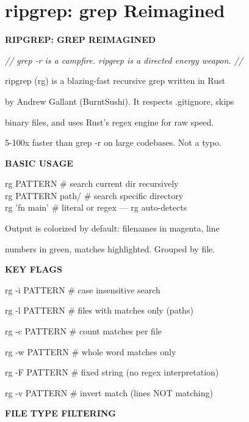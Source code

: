 \documentclass[11pt,a4paper,twoside]{book}
\begin{document}
\section{ripgrep: grep Reimagined}


\vspace{10pt}
{\large\bfseries\color{neoncyan} RIPGREP: GREP REIMAGINED}\vspace{6pt}

{\small\itshape\color{dimtext} // grep -r is a campfire. ripgrep is a directed energy weapon. //}

ripgrep (rg) is a blazing-fast recursive grep written in Rust

by Andrew Gallant (BurntSushi). It respects .gitignore, skips

binary files, and uses Rust's regex engine for raw speed.

5-100x faster than grep -r on large codebases. Not a typo.


\vspace{12pt}
{\bfseries\color{neonyellow} BASIC USAGE}\vspace{4pt}

\begin{codebox}
rg PATTERN           \# search current dir recursively\\
rg PATTERN path/     \# search specific directory\\
rg 'fn main'         \# literal or regex — rg auto-detects\\
\end{codebox}

Output is colorized by default: filenames in magenta, line

numbers in green, matches highlighted. Grouped by file.


\vspace{12pt}
{\bfseries\color{neonyellow} KEY FLAGS}\vspace{4pt}

rg -i PATTERN       \# case insensitive search

rg -l PATTERN       \# files with matches only (paths)

rg -c PATTERN       \# count matches per file

rg -w PATTERN       \# whole word matches only

rg -F PATTERN       \# fixed string (no regex interpretation)

rg -v PATTERN       \# invert match (lines NOT matching)


\vspace{12pt}
{\bfseries\color{neonyellow} FILE TYPE FILTERING}\vspace{4pt}
\end{document}
